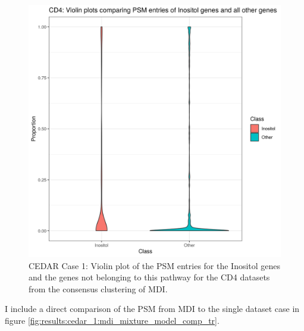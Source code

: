 \documentclass[12pt]{article} %
\begin{document}
\begin{figure}[h]
	\centering
	\includegraphics[scale=0.75]{Images/Biology_data/Set_250/All_datasets/PSM_densities/KEGG_INOSITOL_PHOSPHATE_METABOLISM/CD4.png}
	\caption{CEDAR Case 1: Violin plot of the PSM entries for the Inositol genes and the genes not belonging to this pathway for the CD4 datasets from the consensus clustering of MDI.}
	\label{fig:results:cedar_1:mdi_cd4_inostiol_psm_violin}
\end{figure}
	
	I include a direct comparison of the PSM from MDI to the single dataset case in figure \ref{fig:results:cedar_1:mdi_mixture_model_comp_tr}.
	
	
\end{document}
